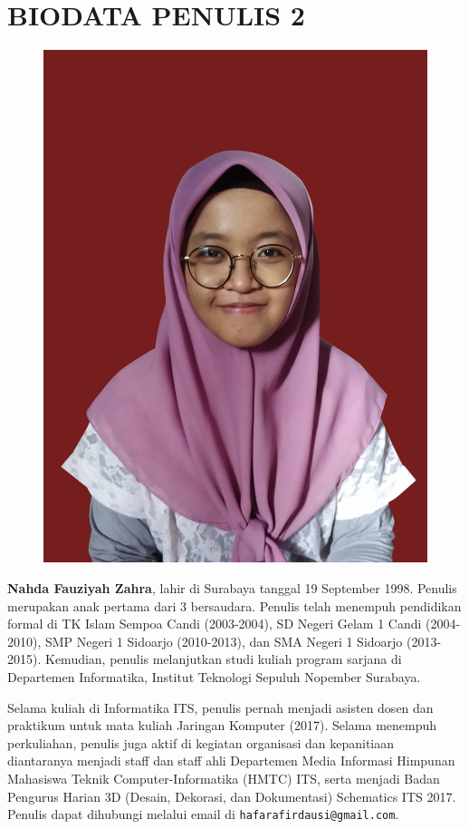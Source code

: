 \cleardoublepage

\newpage
\chapter{BIODATA PENULIS 2}
\begin{figure}
	\includegraphics[height=0.3\textheight]{biodata/foto-hf.jpg}
\end{figure}

\textbf{Nahda Fauziyah Zahra}, lahir di Surabaya tanggal 19 September 1998. Penulis merupakan anak pertama dari 3 bersaudara. Penulis telah menempuh pendidikan formal di TK Islam Sempoa Candi (2003-2004), SD Negeri Gelam 1 Candi (2004-2010), SMP Negeri 1 Sidoarjo (2010-2013), dan SMA Negeri 1 Sidoarjo (2013-2015). Kemudian, penulis melanjutkan studi kuliah program sarjana di Departemen Informatika, Institut Teknologi Sepuluh Nopember Surabaya. 

Selama kuliah di Informatika ITS, penulis pernah menjadi asisten dosen dan praktikum untuk mata kuliah Jaringan Komputer (2017). Selama menempuh perkuliahan, penulis juga aktif di kegiatan organisasi dan kepanitiaan diantaranya menjadi staff dan staff ahli Departemen Media Informasi Himpunan Mahasiswa Teknik Computer-Informatika (HMTC) ITS, serta menjadi Badan Pengurus Harian 3D (Desain, Dekorasi, dan Dokumentasi) Schematics ITS 2017. Penulis dapat dihubungi melalui email di  \texttt{hafarafirdausi@gmail.com}.